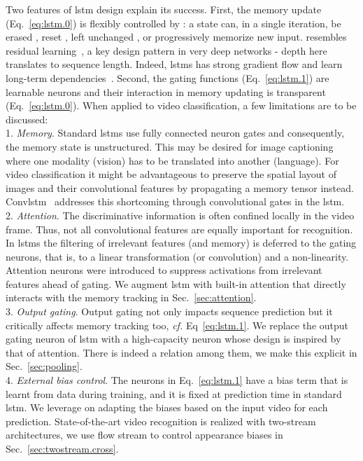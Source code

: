 \documentclass[10pt,twocolumn,letterpaper]{article}
\begin{document}
Two features of \ac{lstm} design explain its success. First, the memory update (Eq.~\ref{eq:lstm.0}) is flexibly controlled by : a state can, in a single iteration, be erased , reset , left unchanged , or progressively memorize new input.  resembles residual learning~\cite{he16residual}, a key design pattern in very deep networks - depth here translates to sequence length. Indeed, \acp{lstm} has strong gradient flow and learn long-term dependencies~\cite{Hochreiter:1997:LSM:1246443.1246450}. Second, the gating functions (Eq.~\ref{eq:lstm.1}) are learnable neurons and their interaction in memory updating is transparent (Eq.~\ref{eq:lstm.0}). When applied to video classification, a few limitations are to be discussed:\\
{1. \em Memory}. Standard \acp{lstm} use fully connected neuron gates and consequently, the memory state is unstructured. This may be desired \eg for image captioning where one modality (vision) has to be translated into another (language). For video classification it might be advantageous to preserve the spatial layout of images and their convolutional features by propagating a memory tensor instead. Conv\ac{lstm}~\cite{shi15convlstm} addresses this shortcoming through convolutional gates in the \ac{lstm}.\\
{2. \em Attention}. The discriminative information is often confined locally in the video frame. Thus, not all convolutional features are equally important for recognition. In \acp{lstm} the filtering of irrelevant features (and memory) is deferred to the gating neurons, that is, to a linear transformation (or convolution) and a non-linearity. Attention neurons were introduced to suppress activations from irrelevant features ahead of gating. We augment \ac{lstm} with built-in attention that directly interacts with the memory tracking in Sec.~\ref{sec:attention}.\\
{3. \em Output gating}. Output gating not only impacts sequence prediction but it critically affects memory tracking too, \emph{cf.} Eq~\ref{eq:lstm.1}. We replace the output gating neuron of \ac{lstm} with a high-capacity neuron whose design is inspired by that of attention. There is indeed a relation among them, we make this explicit in Sec.~\ref{sec:pooling}.\\
{4. \em External bias control}. The neurons in Eq.~\ref{eq:lstm.1} have a bias term that is learnt from data during training, and it is fixed at prediction time in standard \ac{lstm}. We leverage on adapting the biases based on the input video for each prediction. State-of-the-art video recognition is realized with two-stream architectures, we use flow stream to control appearance biases in Sec.~\ref{sec:twostream.cross}.
 
\end{document}
